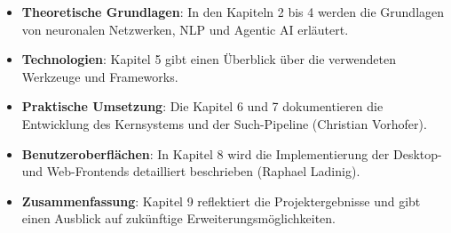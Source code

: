 \begin{itemize}
	\item \textbf{Theoretische Grundlagen}: In den Kapiteln 2 bis 4 werden die Grundlagen von neuronalen Netzwerken, NLP und Agentic AI erläutert.
	\item \textbf{Technologien}: Kapitel 5 gibt einen Überblick über die verwendeten Werkzeuge und Frameworks.
	\item \textbf{Praktische Umsetzung}: Die Kapitel 6 und 7 dokumentieren die Entwicklung des Kernsystems und der Such-Pipeline (Christian Vorhofer).
	\item \textbf{Benutzeroberflächen}: In Kapitel 8 wird die Implementierung der Desktop- und Web-Frontends detailliert beschrieben (Raphael Ladinig).
	\item \textbf{Zusammenfassung}: Kapitel 9 reflektiert die Projektergebnisse und gibt einen Ausblick auf zukünftige Erweiterungsmöglichkeiten.
\end{itemize}
